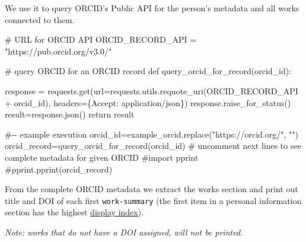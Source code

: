 \documentclass[
  letterpaper,
  DIV=11,
  numbers=noendperiod]{scrreprt}
\newenvironment{Shaded}{\begin{snugshade}}{\end{snugshade}}
\newcommand{\CommentTok}[1]{\textcolor[rgb]{0.37,0.37,0.37}{#1}}
\newcommand{\ControlFlowTok}[1]{\textcolor[rgb]{0.00,0.23,0.31}{#1}}
\newcommand{\KeywordTok}[1]{\textcolor[rgb]{0.00,0.23,0.31}{#1}}
\newcommand{\NormalTok}[1]{\textcolor[rgb]{0.00,0.23,0.31}{#1}}
\newcommand{\OperatorTok}[1]{\textcolor[rgb]{0.37,0.37,0.37}{#1}}
\newcommand{\StringTok}[1]{\textcolor[rgb]{0.13,0.47,0.30}{#1}}
\begin{document}
We use it to query ORCID's Public API for the person's metadata and all
works connected to them.

\begin{Shaded}
\begin{Highlighting}[]
\CommentTok{\# URL for ORCID API}
\NormalTok{ORCID\_RECORD\_API }\OperatorTok{=} \StringTok{"https://pub.orcid.org/v3.0/"}

\CommentTok{\# query ORCID for an ORCID record}
\KeywordTok{def}\NormalTok{ query\_orcid\_for\_record(orcid\_id):}

\NormalTok{    response }\OperatorTok{=}\NormalTok{ requests.get(url}\OperatorTok{=}\NormalTok{requests.utils.requote\_uri(ORCID\_RECORD\_API }\OperatorTok{+}\NormalTok{ orcid\_id),}
\NormalTok{                          headers}\OperatorTok{=}\NormalTok{\{}\StringTok{\textquotesingle{}Accept\textquotesingle{}}\NormalTok{: }\StringTok{\textquotesingle{}application/json\textquotesingle{}}\NormalTok{\})}
\NormalTok{    response.raise\_for\_status()}
\NormalTok{    result}\OperatorTok{=}\NormalTok{response.json()}
    \ControlFlowTok{return}\NormalTok{ result}


\CommentTok{\#{-}{-} example execution}
\NormalTok{orcid\_id}\OperatorTok{=}\NormalTok{example\_orcid.replace(}\StringTok{"https://orcid.org/"}\NormalTok{, }\StringTok{""}\NormalTok{)}
\NormalTok{orcid\_record}\OperatorTok{=}\NormalTok{query\_orcid\_for\_record(orcid\_id)}
\CommentTok{\# uncomment next lines to see complete metadata for given ORCID}
\CommentTok{\#import pprint}
\CommentTok{\#pprint.pprint(orcid\_record)}
\end{Highlighting}
\end{Shaded}

From the complete ORCID metadata we extract the works section and print
out title and DOI of each first \texttt{work-summary} (the first item in
a personal information section has the highest
\href{https://info.orcid.org/documentation/integration-guide/orcid-record/\#Display_index}{display
index}).

\emph{Note: works that do not have a DOI assigned, will not be printed.}
\end{document}

